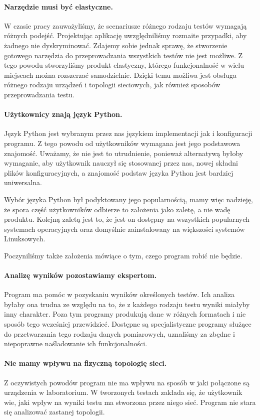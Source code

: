 \documentclass[00-praca-magisterska.tex]{subfiles}
\begin{document}
\paragraph{Narzędzie musi być elastyczne.} W czasie pracy zauważyliśmy, że
scenariusze różnego rodzaju testów wymagają różnych podejść. Projektując
aplikację uwzględniliśmy rozmaite przypadki, aby żadnego nie dyskryminować.
Zdajemy sobie jednak sprawę, że stworzenie gotowego narzędzia do przeprowadzania
wszystkich testów nie jest możliwe. Z tego powodu stworzyliśmy produkt
elastyczny, którego funkcjonalność w wielu miejscach można rozszerzać
samodzielnie. Dzięki temu możliwa jest obsługa różnego rodzaju urządzeń i
topologii sieciowych, jak również sposobów przeprowadzania testu.

\paragraph{Użytkownicy znają język Python.} Język Python jest wybranym przez nas
językiem implementacji jak i konfiguracji programu. Z tego powodu od
użytkowników wymagana jest jego podstawowa znajomość. Uważamy, że nie jest to
utrudnienie, ponieważ alternatywą byłoby wymaganie, aby użytkownik nauczył się
stosowanej przez nas, nowej składni plików konfiguracyjnych, a znajomość podstaw
języka Python jest bardziej uniwersalna.

Wybór języka Python był podyktowany jego popularnością, mamy więc nadzieję, że
spora część użytkowników odbierze to założenia jako zaletę, a nie wadę
produktu. Kolejną zaletą jest to, że jest on dostępny na wszystkich popularnych
systemach operacyjnych oraz domyślnie zainstalowany na większości systemów
Linuksowych.

Poczyniliśmy także założenia mówiące o tym, czego program robić nie będzie.

\paragraph{Analizę wyników pozostawiamy ekspertom.} Program ma pomóc w
pozyskaniu wyników określonych testów. Ich analiza byłaby ona trudna ze
względu na to, że z każdego rodzaju testu wyniki miałyby inny charakter. Poza
tym programy produkują dane w różnych formatach i nie sposób tego wcześniej
przewidzieć. Dostępne są specjalistyczne programy służące do przetwarzania tego
rodzaju danych pomiarowych, uznaliśmy za zbędne i niepoprawne naśladowanie ich
funkcjonalności.

\paragraph{Nie mamy wpływu na fizyczną topologię sieci.} Z oczywistych powodów
program nie ma wpływu na sposób w jaki połączone są urządzenia w laboratorium. W
tworzonych testach zakłada się, że użytkownik wie, jaki wpływ na wyniki testu ma
stworzona przez niego sieć. Program nie stara się analizować zastanej topologii.
\end{document}
